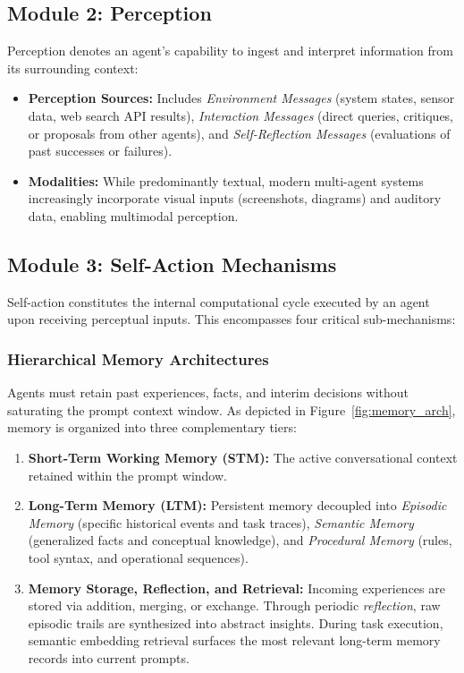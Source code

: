 \documentclass[12pt,a4paper]{report}
\begin{document}
\subsection{Module 2: Perception}
Perception denotes an agent's capability to ingest and interpret information from its surrounding context:
\begin{itemize}
    \item \textbf{Perception Sources:} Includes \textit{Environment Messages} (system states, sensor data, web search API results), \textit{Interaction Messages} (direct queries, critiques, or proposals from other agents), and \textit{Self-Reflection Messages} (evaluations of past successes or failures).
    \item \textbf{Modalities:} While predominantly textual, modern multi-agent systems increasingly incorporate visual inputs (screenshots, diagrams) and auditory data, enabling multimodal perception.
\end{itemize}

\subsection{Module 3: Self-Action Mechanisms}
Self-action constitutes the internal computational cycle executed by an agent upon receiving perceptual inputs. This encompasses four critical sub-mechanisms:

\subsubsection{Hierarchical Memory Architectures}
Agents must retain past experiences, facts, and interim decisions without saturating the prompt context window. As depicted in Figure~\ref{fig:memory_arch}, memory is organized into three complementary tiers:
\begin{enumerate}
    \item \textbf{Short-Term Working Memory (STM):} The active conversational context retained within the prompt window.
    \item \textbf{Long-Term Memory (LTM):} Persistent memory decoupled into \textit{Episodic Memory} (specific historical events and task traces), \textit{Semantic Memory} (generalized facts and conceptual knowledge), and \textit{Procedural Memory} (rules, tool syntax, and operational sequences).
    \item \textbf{Memory Storage, Reflection, and Retrieval:} Incoming experiences are stored via addition, merging, or exchange. Through periodic \textit{reflection}, raw episodic trails are synthesized into abstract insights. During task execution, semantic embedding retrieval surfaces the most relevant long-term memory records into current prompts.
\end{enumerate}
\end{document}
